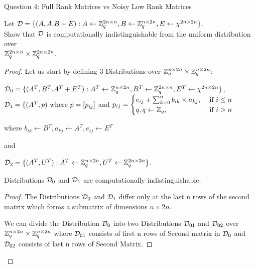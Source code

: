 \begin{solution}{Question 4: Full Rank Matrices vs Noisy Low Rank Matrices}\label{ques:4}
    \begin{question}
    Let $\mathcal{D} = \{ (A,A.B +E) : A \leftarrow \mathbb{Z}_q^{2n\times n}, B \leftarrow \mathbb{Z}_q^{n\times 2n}, E \leftarrow \chi^{2n\times 2n} \}$.\\
    Show that $\mathcal{D}$ is computationally indistinguishable from the uniform distribution over \\ $\mathbb{Z}_q^{2n\times n} \times \mathbb{Z}_q^{2n\times2n}$.
    \end{question}
    \tcblower{}
    
    \begin{proof}
    Let us start by defining 3 Distributions over $\mathbb{Z}_q^{n\times 2n} \times \mathbb{Z}_q^{n\times 2n}$:
     
     $\mathcal{D}_0 = \{ (A^T,B^T . A^T +E^T) : A^T \leftarrow \mathbb{Z}_q^{n\times 2n}, B^T \leftarrow \mathbb{Z}_q^{2n\times n}, E^T \leftarrow \chi^{2n\times 2n} \}$,\\

     $\mathcal{D}_1 = \{ (A^T,p) \text{ where } p = [p_{ij}]$ and  $p_{ij} = 
     \begin{cases}
      e_{ij} + \sum_{k=0}^{n} b_{ik}\times a_{kj} , &\text{ if } i \leq n \\
      q, q\leftarrow \mathbb{Z}_q, &\text{ if } i>n
     \end{cases} $
     
     where $ b_{ik}\leftarrow B^T, a_{kj}\leftarrow A^T, e_{ij}\leftarrow E^T $

     and 

     $\mathcal{D}_2 = \{ (A^T,U^T) : A^T \leftarrow \mathbb{Z}_q^{n\times 2n}, U^T \leftarrow \mathbb{Z}_q^{2n\times 2n} \}$.

     \begin{claim}
     Distributions $\mathcal{D}_0$ and $\mathcal{D}_1$ are computationally indistinguishable.
     \end{claim}

     \begin{proof}
         The Distributions $\mathcal{D}_0$ and $\mathcal{D}_1$ differ only at the last n rows of the second matrix which forms a submatrix of dimensions $n \times 2n$.

         We can divide the Distribution $\mathcal{D}_0$ into two Distributions $\mathcal{D}_{01}$ and $\mathcal{D}_{02}$ over $\mathbb{Z}_q^{n\times 2n} \times \mathbb{Z}_q^{n\times 2n}$ where $\mathcal{D}_{01}$ consists of first n rows of Second matrix in $\mathcal{D}_0$ and $\mathcal{D}_{02}$ consists of last n rows of Second Matrix.


\end{proof}
\end{proof}
\end{solution}
